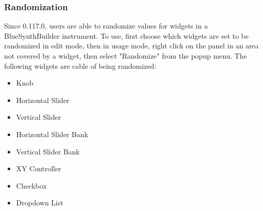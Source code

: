 \subsubsection{Randomization}\label{bsbWidgetRandomization}

Since 0.117.0, users are able to randomize values for widgets in a
BlueSynthBuilder instrument. To use, first choose which widgets are set
to be randomized in edit mode, then in usage mode, right click on the
panel in an area not covered by a widget, then select "Randomize" from
the popup menu. The following widgets are cable of being randomized:

\begin{itemize}
\item
  Knob
\item
  Horizontal Slider
\item
  Vertical Slider
\item
  Horizontal Slider Bank
\item
  Vertical Slider Bank
\item
  XY Controller
\item
  Checkbox
\item
  Dropdown List
\end{itemize}
